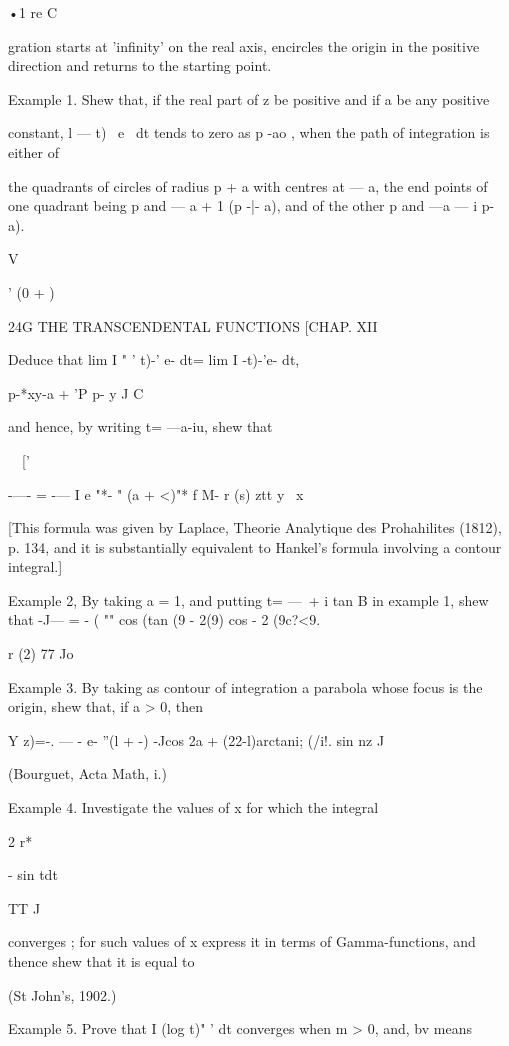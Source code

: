 •1 re C

gration starts at 'infinity' on the real axis, encircles the origin in
the positive direction and returns to the starting point.

Example 1. Shew that, if the real part of z be positive and if a be
any positive

constant, l — t)~ e~ dt tends to zero as p -ao , when the path of
integration is either of

the quadrants of circles of radius p + a with centres at — a, the end
points of one quadrant being p and — a + 1 (p -|- a), and of the other
p and —a — i p- a).



V

' (0 + )



24G THE TRANSCENDENTAL FUNCTIONS [CHAP. XII

Deduce that lim I " ' t)-' e- dt= lim I -t)-'e- dt,

p-*xy-a + 'P p- y J C

and hence, by writing t= —a-iu, shew that

\ \ ['

-—- = -— I e "*- " (a + <)"* f M- r (s) ztt y \ x

[This formula was given by Laplace, Theorie Analytique des
Prohahilites (1812), p. 134, and it is substantially equivalent to
Hankel's formula involving a contour integral.]

Example 2, By taking a = 1, and putting t= —\ + i tan B in example 1,
shew that -J— = - ( "" cos (tan (9 - 2(9) cos - 2 (9c?<9.

r (2) 77 Jo

Example 3. By taking as contour of integration a parabola whose focus
is the origin, shew that, if a > 0, then

Y z)=-. — - e- ''(l + -) -Jcos 2a + (22-l)arctani; (/i!. sin nz J

(Bourguet, Acta Math, i.)

Example 4. Investigate the values of x for which the integral

2 r*

 - sin tdt

TT J

converges ; for such values of x express it in terms of
Gamma-functions, and thence shew that it is equal to

(St John's, 1902.)

Example 5. Prove that I (log t)" ' dt converges when m > 0, and, bv
means

